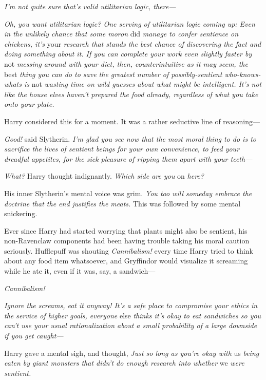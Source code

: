\emph{I'm not quite sure that's valid utilitarian logic, there---}

\emph{Oh, you want utilitarian logic? One serving of utilitarian logic coming
up: Even in the unlikely chance that some moron} did \emph{manage to confer
sentience on chickens, it's} your \emph{research that stands the best chance of
discovering the fact and doing something about it. If you can complete your
work even slightly faster by} not \emph{messing around with your diet, then,
counterintuitive as it may seem, the} best \emph{thing you can do to save the
greatest number of possibly-sentient who-knows-whats is} not \emph{wasting time
on wild guesses about what might be intelligent. It's not like the house elves
haven't prepared the food already, regardless of what you take onto your plate.}

Harry considered this for a moment. It was a rather seductive line of
reasoning---

\emph{Good!} said Slytherin. \emph{I'm glad you see now that the most moral
thing to do is to sacrifice the lives of sentient beings for your own
convenience, to feed your dreadful appetites, for the sick pleasure of ripping
them apart with your teeth---}

\emph{What?} Harry thought indignantly. \emph{Which side are you} on \emph{
here?}

His inner Slytherin's mental voice was grim. \emph{You too will someday embrace
the doctrine{\el} that the end justifies the meats.} This was followed by
some mental snickering.

Ever since Harry had started worrying that plants might also be sentient, his
non-Ravenclaw components had been having trouble taking his moral caution
seriously. Hufflepuff was shouting \emph{Cannibalism!} every time Harry tried
to think about any food item whatsoever, and Gryffindor would visualize it
screaming while he ate it, even if it was, say, a sandwich---

\emph{Cannibalism!}

\emph{}

\emph{Ignore the screams, eat it anyway! It's a safe place to compromise your
ethics in the service of higher goals, everyone} else \emph{thinks it's okay to
eat sandwiches so you can't use your usual rationalization about a small
probability of a large downside if you get caught---}

Harry gave a mental sigh, and thought, \emph{Just so long as you're okay with}
us \emph{being eaten by giant monsters that didn't do enough research into
whether} we \emph{were sentient.}

